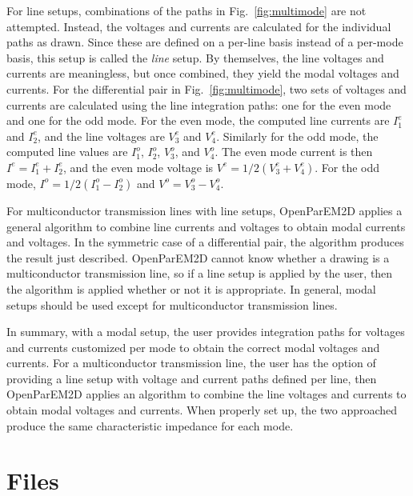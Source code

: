 \documentclass[titlepage]{article}
\renewcommand\_{\textunderscore\linebreak[1]}
\begin{document}
For line setups, combinations of the paths in Fig.~\ref{fig:multimode} are not attempted.  Instead, the voltages and currents are calculated for the individual paths as drawn.  Since these are defined on a per-line basis instead of a per-mode basis, this setup is called the \textit{line} setup.  By themselves, the line voltages and currents are meaningless, but once combined, they yield the modal voltages and currents.  For the differential pair in Fig.~\ref{fig:multimode}, two sets of voltages and currents are calculated using the line integration paths: one for the even mode and one for the odd mode.  For the even mode, the computed line currents are $I_1^e$ and $I_2^e$, and the line voltages are $V_3^e$ and $V_4^e$.  Similarly for the odd mode, the computed line values are $I_1^o$, $I_2^o$, $V_3^o$, and $V_4^o$.  The even mode current is then $I^e=I_1^e+I_2^e$, and the even mode voltage is $V^e=1/2(V_3^e+V_4^e)$.  For the odd mode, $I^o=1/2(I_1^o-I_2^o)$ and $V^o=V_3^o-V_4^o$.

For multiconductor transmission lines with line setups, OpenParEM2D applies a general algorithm to combine line currents and voltages to obtain modal currents and voltages.  In the symmetric case of a differential pair, the algorithm produces the result just described.  OpenParEM2D cannot know whether a drawing is a multiconductor transmission line, so if a line setup is applied by the user, then the algorithm is applied whether or not it is appropriate.  In general, modal setups should be used except for multiconductor transmission lines.

In summary, with a modal setup, the user provides integration paths for voltages and currents customized per mode to obtain the correct modal voltages and currents.  For a multiconductor transmission line, the user has the option of providing a line setup with voltage and current paths defined per line, then OpenParEM2D applies an algorithm to combine the line voltages and currents to obtain modal voltages and currents.  When properly set up, the two approached produce the same characteristic impedance for each mode.

\section{Files}
\label{sec:files}
\end{document}
